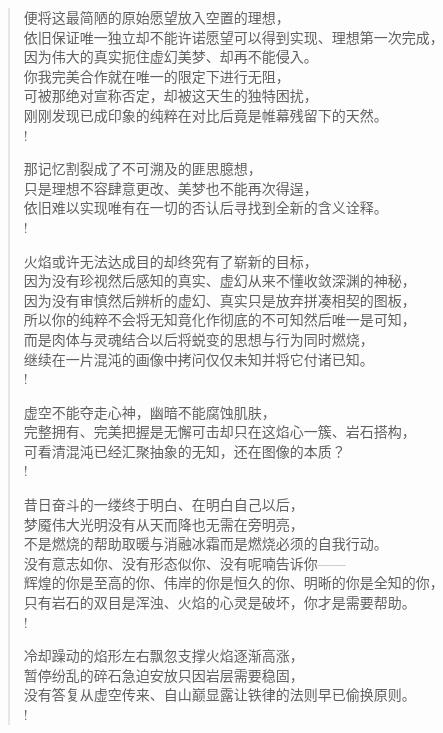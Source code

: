 \documentclass[UTF8, 12pt, a4paper]{ctexrep} %
\begin{document}
\begin{verse}
便将这最简陋的原始愿望放入空置的理想，\\
依旧保证唯一独立却不能许诺愿望可以得到实现、理想第一次完成，\\
因为伟大的真实扼住虚幻美梦、却再不能侵入。\\
你我完美合作就在唯一的限定下进行无阻，\\
可被那绝对宣称否定，却被这天生的独特困扰，\\
刚刚发现已成印象的纯粹在对比后竟是帷幕残留下的天然。\\!

那记忆割裂成了不可溯及的匪思臆想，\\
只是理想不容肆意更改、美梦也不能再次得逞，\\
依旧难以实现唯有在一切的否认后寻找到全新的含义诠释。\\!

火焰或许无法达成目的却终究有了崭新的目标，\\
因为没有珍视然后感知的真实、虚幻从来不懂收敛深渊的神秘，\\
因为没有审慎然后辨析的虚幻、真实只是放弃拼凑相契的图板，\\
所以你的纯粹不会将无知竟化作彻底的不可知然后唯一是可知，\\
而是肉体与灵魂结合以后将蜕变的思想与行为同时燃烧，\\
继续在一片混沌的画像中拷问仅仅未知并将它付诸已知。\\!

虚空不能夺走心神，幽暗不能腐蚀肌肤，\\
完整拥有、完美把握是无懈可击却只在这焰心一簇、岩石搭构，\\
可看清混沌已经汇聚抽象的无知，还在图像的本质？\\!

昔日奋斗的一缕终于明白、在明白自己以后，\\
梦魇伟大光明没有从天而降也无需在旁明亮，\\
不是燃烧的帮助取暖与消融冰霜而是燃烧必须的自我行动。\\
没有意志如你、没有形态似你、没有呢喃告诉你——\\
辉煌的你是至高的你、伟岸的你是恒久的你、明晰的你是全知的你，\\
只有岩石的双目是浑浊、火焰的心灵是破坏，你才是需要帮助。\\!

冷却躁动的焰形左右飘忽支撑火焰逐渐高涨，\\
暂停纷乱的碎石急迫安放只因岩层需要稳固，\\
没有答复从虚空传来、自山巅显露让铁律的法则早已偷换原则。\\!


\end{verse}
\end{document}
